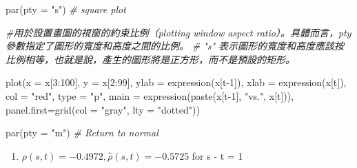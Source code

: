 \documentclass[
]{book}
\newenvironment{Shaded}{\begin{snugshade}}{\end{snugshade}}
\newcommand{\AttributeTok}[1]{\textcolor[rgb]{0.77,0.63,0.00}{#1}}
\newcommand{\CommentTok}[1]{\textcolor[rgb]{0.56,0.35,0.01}{\textit{#1}}}
\newcommand{\DecValTok}[1]{\textcolor[rgb]{0.00,0.00,0.81}{#1}}
\newcommand{\FunctionTok}[1]{\textcolor[rgb]{0.00,0.00,0.00}{#1}}
\newcommand{\NormalTok}[1]{#1}
\newcommand{\SpecialCharTok}[1]{\textcolor[rgb]{0.00,0.00,0.00}{#1}}
\newcommand{\StringTok}[1]{\textcolor[rgb]{0.31,0.60,0.02}{#1}}
\providecommand{\tightlist}{%
  \setlength{\itemsep}{0pt}\setlength{\parskip}{0pt}}
\theoremstyle{definition}
\theoremstyle{definition}
\theoremstyle{definition}
\theoremstyle{definition}
\theoremstyle{remark}
\begin{document}
\begin{Shaded}
\begin{Highlighting}[]
\FunctionTok{par}\NormalTok{(}\AttributeTok{pty =} \StringTok{"s"}\NormalTok{) }\CommentTok{\# square plot}

\CommentTok{\#用於設置畫圖的視窗的約束比例（plotting window aspect ratio）。具體而言，pty 參數指定了圖形的寬度和高度之間的比例。}
\CommentTok{\# "s" 表示圖形的寬度和高度應該按比例相等，也就是說，產生的圖形將是正方形，而不是預設的矩形。}

\FunctionTok{plot}\NormalTok{(}\AttributeTok{x =}\NormalTok{ x[}\DecValTok{3}\SpecialCharTok{:}\DecValTok{100}\NormalTok{], }\AttributeTok{y =}\NormalTok{ x[}\DecValTok{2}\SpecialCharTok{:}\DecValTok{99}\NormalTok{], }\AttributeTok{ylab =} \FunctionTok{expression}\NormalTok{(x[t}\DecValTok{{-}1}\NormalTok{]),}
    \AttributeTok{xlab =} \FunctionTok{expression}\NormalTok{(x[t]), }\AttributeTok{col =} \StringTok{"red"}\NormalTok{, }\AttributeTok{type =} \StringTok{"p"}\NormalTok{,}
    \AttributeTok{main =} \FunctionTok{expression}\NormalTok{(}\FunctionTok{paste}\NormalTok{(x[t}\DecValTok{{-}1}\NormalTok{], }\StringTok{"vs."}\NormalTok{, x[t])),}
    \AttributeTok{panel.first=}\FunctionTok{grid}\NormalTok{(}\AttributeTok{col =} \StringTok{"gray"}\NormalTok{, }\AttributeTok{lty =} \StringTok{"dotted"}\NormalTok{))}
  
\FunctionTok{par}\NormalTok{(}\AttributeTok{pty =} \StringTok{"m"}\NormalTok{) }\CommentTok{\# Return to normal}
\end{Highlighting}
\end{Shaded}

\begin{enumerate}
\def\labelenumi{\arabic{enumi}.}
\setcounter{enumi}{1}
\tightlist
\item
  \(\rho(s,t)=-0.4972, \hat{\rho}(s,t)=-0.5725\) for \textbar s - t\textbar{} = 1
\end{enumerate}
\end{document}
